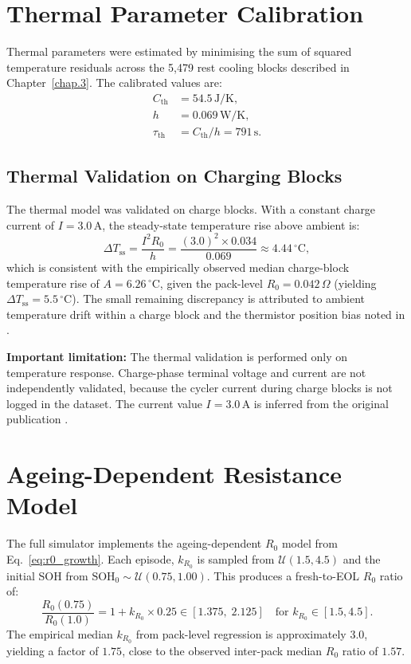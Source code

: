\section{Thermal Parameter Calibration}

Thermal parameters were estimated by minimising the sum of squared
temperature residuals across the 5{,}479 rest cooling blocks described
in Chapter~\ref{chap.3}.  The calibrated values are:
\begin{align*}
  C_{\mathrm{th}} &= 54.5\,\mathrm{J/K}, \\
  h               &= 0.069\,\mathrm{W/K}, \\
  \tau_{\mathrm{th}} &= C_{\mathrm{th}} / h = 791\,\mathrm{s}.
\end{align*}

\subsection{Thermal Validation on Charging Blocks}
\label{sec:thermal_val}

The thermal model was validated on charge blocks.  With a constant
charge current of $I = 3.0\,\mathrm{A}$, the steady-state temperature
rise above ambient is:
\begin{equation}
  \Delta T_{\mathrm{ss}} = \frac{I^2 R_0}{h}
  = \frac{(3.0)^2 \times 0.034}{0.069} \approx 4.44\,^\circ\mathrm{C},
  \label{eq:delta_T_ss}
\end{equation}
which is consistent with the empirically observed median
charge-block temperature rise of $A = 6.26\,^\circ\mathrm{C}$,
given the pack-level $R_0 = 0.042\,\Omega$ (yielding
$\Delta T_{\mathrm{ss}} = 5.5\,^\circ\mathrm{C}$).  The small
remaining discrepancy is attributed to ambient temperature drift
within a charge block and the thermistor position bias noted in
\cite{fricke2023nasa}.

\textbf{Important limitation:} The thermal validation is performed
only on temperature response.  Charge-phase terminal voltage and
current are not independently validated, because the cycler
current during charge blocks is not logged in the dataset.  The
current value $I = 3.0\,\mathrm{A}$ is inferred from the original
publication \cite{fricke2023nasa}.

\section{Ageing-Dependent Resistance Model}

The full simulator implements the ageing-dependent $R_0$ model from
Eq.~\ref{eq:r0_growth}.  Each episode, $k_{R_0}$ is sampled from
$\mathcal{U}(1.5, 4.5)$ and the initial SOH from
$\mathrm{SOH}_0 \sim \mathcal{U}(0.75, 1.00)$.  This produces a
fresh-to-EOL $R_0$ ratio of:
\begin{equation}
  \frac{R_0(0.75)}{R_0(1.0)} = 1 + k_{R_0} \times 0.25
  \in [1.375,\; 2.125] \quad \text{for } k_{R_0} \in [1.5, 4.5].
\end{equation}
The empirical median $k_{R_0}$ from pack-level regression is
approximately 3.0, yielding a factor of $1.75$, close to the
observed inter-pack median $R_0$ ratio of $1.57$.

